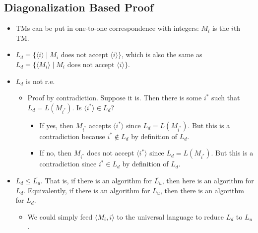 \documentclass[12pt]{article}
\begin{document}
\subsection{Diagonalization Based Proof}
\begin{itemize}
    \item TMs can be put in one-to-one correspondence with integers: $M_i$ is the $i$th TM.
    \item $L_d = \{ \langle i \rangle \mid \text{$M_i$ does not accept $\langle i \rangle$} \}$, which is also the same as $L_d = \{ \langle M_i \rangle \mid \text{$M_i$ does not accept $\langle i \rangle$} \}$.
    \item $L_d$ is not r.e.
    \begin{itemize}
        \item Proof by contradiction. Suppose it is. Then there is some $i^\ast$ such that $L_d = L(M_{i^\ast})$. Is $\langle i^\ast \rangle \in L_d$?
        \begin{itemize}
            \item If yes, then $M_{i^\ast}$ accepts $\langle i^\ast \rangle$ since $L_d = L(M_{i^\ast})$. But this is a contradiction because $i^\ast \notin L_d$ by definition of $L_d$.
            \item If no, then $M_{i^\ast}$ does not accept $\langle i^\ast \rangle$ since $L_d = L(M_{i^\ast})$. But this is a contradiction since $i^\ast \in L_d$ by definition of $L_d$.
        \end{itemize}
    \end{itemize}
    \item $L_d \leq \overline{L_u}$. That is, if there is an algorithm for $\overline{L_u}$, then here is an algorithm for $L_d$. Equivalently, if there is an algorithm for $L_u$, then there is an algorithm for $L_d$.
    \begin{itemize}
        \item We could simply feed $\langle M_i, i \rangle$ to the universal language to reduce $L_d$ to $L_u$.
    \end{itemize}
\end{itemize}
\end{document}
